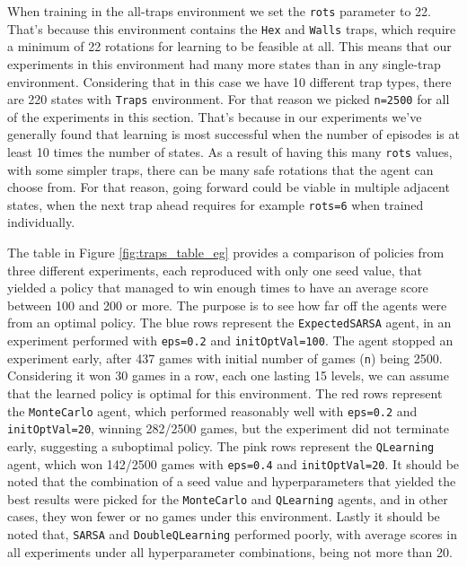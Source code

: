 When training in the all-traps environment we set the \texttt{rots} parameter to 22.  That's because this environment contains the \texttt{Hex} and \texttt{Walls} traps, which require a minimum of 22 rotations for learning to be feasible at all. This means that our experiments in this environment had many more states than in any single-trap environment. Considering that in this case we have 10 different trap types, there are 220 states with \texttt{Traps} environment. For that reason we picked \texttt{n=2500} for all of the experiments in this section. That's because in our experiments we've generally found that learning is most successful when the number of episodes is at least 10 times the number of states. As a result of having this many \texttt{rots} values, with some simpler traps, there can be many safe rotations that the agent can choose from. For that reason, going forward could be viable in multiple adjacent states, when the next trap ahead requires for example \texttt{rots=6} when trained individually.

The table in Figure \ref{fig:traps_table_eg} provides a comparison of policies from three different experiments, each reproduced with only one seed value, that yielded a policy that managed to win enough times to have an average score between 100 and 200 or more. The purpose is to see how far off the agents were from an optimal policy. The blue rows represent the \texttt{ExpectedSARSA} agent, in an experiment performed with \texttt{eps=0.2} and \texttt{initOptVal=100}. The agent stopped an experiment early, after 437 games with initial number of games (\texttt{n}) being 2500. Considering it won 30 games in a row, each one lasting 15 levels, we can assume that the learned policy is optimal for this environment. The red rows represent the \texttt{MonteCarlo} agent, which performed reasonably well with \texttt{eps=0.2} and \texttt{initOptVal=20}, winning 282/2500 games, but the experiment did not terminate early, suggesting a suboptimal policy. The pink rows represent the \texttt{QLearning} agent, which won 142/2500 games with \texttt{eps=0.4} and \texttt{initOptVal=20}. It should be noted that the combination of a seed value and hyperparameters that yielded the best results were picked for the \texttt{MonteCarlo} and \texttt{QLearning} agents, and in other cases, they won fewer or no games under this environment. Lastly it should be noted that, \texttt{SARSA} and \texttt{DoubleQLearning}  performed poorly, with average scores in all experiments under all hyperparameter combinations, being not more than 20.

